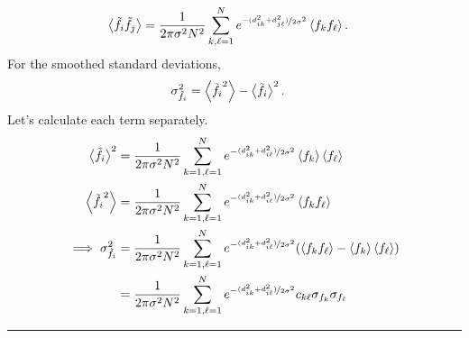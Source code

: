 \documentclass{article}
\begin{document}
\begin{multicols}{2}
\begin{align*}
    \expval{\Tilde{f}_i\Tilde{f}_j} &= \frac{1}{2\pi\sigma^2N^2}\sum_{k, \ell =1}^N e^{\nicefrac{-(d_{ik}^2+d_{j\ell}^2)}{2\sigma^2}}\expval{f_kf_\ell}.
\end{align*}
For the smoothed standard deviations,
\begin{align*}
    \sigma_{\Tilde{f_i}}^2 &= \expval{\Tilde{f_i}^2} - \expval{\Tilde{f_i}}^2.
\end{align*}
Let's calculate each term separately. 
\begin{align*}
     \expval{\Tilde{f_i}}^2 &= \frac{1}{2\pi\sigma^2N^2}\sum_{k=1, \ell=1}^N e^{-\nicefrac{(d_{ik}^2+ d_{i\ell}^2)}{2\sigma^2}}\expval{f_k}\expval{f_\ell}\\
    \expval{\Tilde{f_i}^2} &= \frac{1}{2\pi\sigma^2N^2}\sum_{k=1, \ell=1}^N e^{-\nicefrac{(d_{ik}^2+ d_{i\ell}^2)}{2\sigma^2}}\expval{f_k f_\ell}\\
    \implies \sigma_{\Tilde{f_i}}^2 &= \frac{1}{2\pi\sigma^2N^2}\sum_{k=1, \ell=1}^N e^{-\nicefrac{(d_{ik}^2+ d_{i\ell}^2)}{2\sigma^2}}\qty(\expval{f_k f_\ell} - \expval{f_k}\expval{f_\ell})\\
    &= \frac{1}{2\pi\sigma^2N^2}\sum_{k=1, \ell=1}^N e^{-\nicefrac{(d_{ik}^2+ d_{i\ell}^2)}{2\sigma^2}}c_{k\ell}\sigma_{f_k}\sigma_{f_\ell}
\end{align*}
\end{multicols}
\centering
\rule{0.66\textwidth}{0.4pt}

\raggedright
\vspace{10pt}
\end{document}

